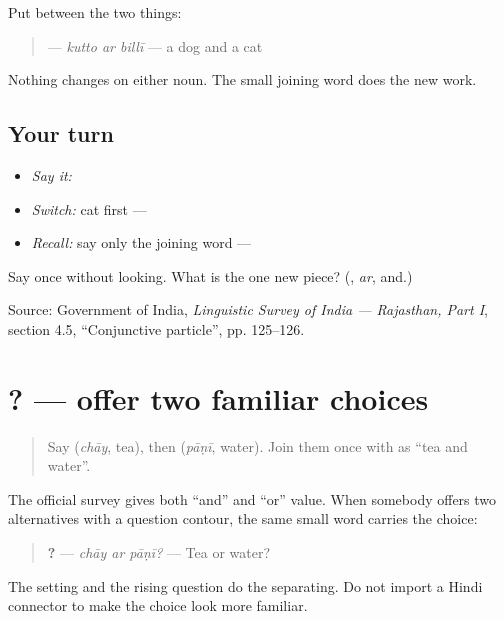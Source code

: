 \begin{grammarlens}[title={What you've built}]
Put \textbf{} between the two things:

\begin{quote}
\textbf{  } — \emph{kutto ar billī} — a dog and a cat
\end{quote}

Nothing changes on either noun. The small joining word does the new work.
\end{grammarlens}

\subsection*{Your turn}
\begin{itemize}
\raggedright
  \item \emph{Say it:} \textbf{  }
  \item \emph{Switch:} cat first — \textbf{  }
  \item \emph{Recall:} say only the joining word — \textbf{}
\end{itemize}

\begin{tcolorbox}[breakable,colback=teal!4,colframe=teal!35!black,title={Before you move on}]
Say \textbf{  } once without looking. What is the one new piece? (\textbf{}, \emph{ar}, and.)

Source: Government of India, \emph{Linguistic Survey of India — Rajasthan, Part I}, section 4.5, “Conjunctive particle”, pp. 125–126.
\end{tcolorbox}
\section[\texorpdfstring{\mw{चाय} \mw{अर} \mw{पाणी}? (chāy ar pāṇī?)}{चाय अर पाणी? (chāy ar pāṇī?)}]{  ? — offer two familiar choices}

\label{lesson:MW-C151-ar-choice}



\begin{quote}
Say \textbf{} (\emph{chāy}, tea), then \textbf{} (\emph{pāṇī}, water). Join them once with \textbf{} as “tea and water”.
\end{quote}

\begin{grammarlens}[title={What you've built}]
The official survey gives \textbf{} both “and” and “or” value. When somebody offers two alternatives with a question contour, the same small word carries the choice:

\begin{quote}
\textbf{  ?} — \emph{chāy ar pāṇī?} — Tea or water?
\end{quote}

The setting and the rising question do the separating. Do not import a Hindi connector to make the choice look more familiar.
\end{grammarlens}

